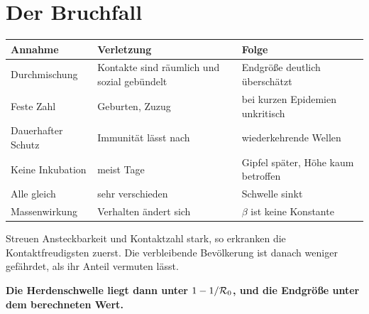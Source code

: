 \section{Der Bruchfall}

\begin{warnung}
\begin{center}
{\small
\renewcommand{\arraystretch}{1.5}
\begin{tabular}{@{}P{2.2cm}P{3.0cm}P{3.0cm}@{}}
\toprule
\textbf{Annahme} & \textbf{Verletzung} & \textbf{Folge}\\
\midrule
Durch\-mischung & Kontakte sind räumlich und sozial gebündelt & \textcolor{akzent}{Endgröße deutlich überschätzt}\\
Feste Zahl & Geburten, Zuzug & bei kurzen Epidemien unkritisch\\
Dauerhafter Schutz & Immunität lässt nach & wiederkehrende Wellen\\
Keine Inkubation & meist Tage & Gipfel später, Höhe kaum betroffen\\
Alle gleich & sehr verschieden & \textcolor{akzent}{Schwelle sinkt}\\
Massen\-wirkung & Verhalten ändert sich & \textcolor{akzent}{$\beta$ ist keine Konstante}\\
\bottomrule
\end{tabular}}
\end{center}

Streuen Ansteckbarkeit und Kontaktzahl stark, so erkranken die Kontaktfreudigsten zuerst. Die verbleibende Bevölkerung ist danach weniger gefährdet, als ihr Anteil vermuten lässt.

\begin{center}
\begin{minipage}{0.9\textwidth}
\textbf{Die Herdenschwelle liegt dann unter $1-1/\mathcal{R}_0$, und die Endgröße unter dem berechneten Wert.}
\end{minipage}
\end{center}

\begin{center}
\begin{minipage}{0.88\textwidth}
\end{minipage}
\end{center}


\end{warnung}
